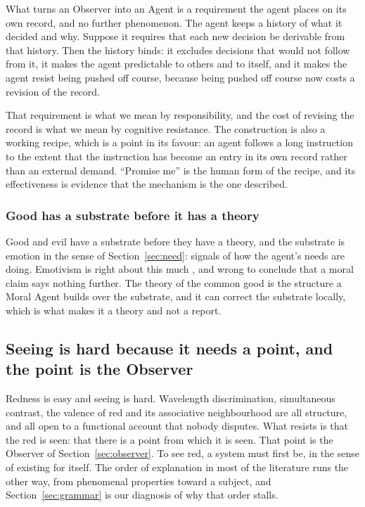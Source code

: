 What turns an Observer into an Agent is a requirement the agent places on its own record, and no
further phenomenon. The agent keeps a history of what it decided and why. Suppose it requires that each
new decision be derivable from that history. Then the history binds: it excludes decisions that would
not follow from it, it makes the agent predictable to others and to itself, and it makes the agent
resist being pushed off course, because being pushed off course now costs a revision of the record.

That requirement is what we mean by responsibility, and the cost of revising the record is what we mean
by cognitive resistance. The construction is also a working recipe, which is a point in its favour: an
agent follows a long instruction to the extent that the instruction has become an entry in its own
record rather than an external demand. ``Promise me'' is the human form of the recipe, and its
effectiveness is evidence that the mechanism is the one described.

\subsubsection{Good has a substrate before it has a theory}

Good and evil have a substrate before they have a theory, and the substrate is emotion in the sense of
Section~\ref{sec:need}: signals of how the agent's needs are doing. Emotivism is right about this much
\citep{ayer1936}, and wrong to conclude that a moral claim says nothing further. The theory of the
common good is the structure a Moral Agent builds over the substrate, and it can correct the substrate
locally, which is what makes it a theory and not a report.

\subsection{Seeing is hard because it needs a point, and the point is the Observer}
\label{sec:seeing}

Redness is easy and seeing is hard. Wavelength discrimination, simultaneous contrast, the valence of red
and its associative neighbourhood are all structure, and all open to a functional account that nobody
disputes. What resists is that the red is seen: that there is a point from which it is seen. That point
is the Observer of Section~\ref{sec:observer}. To see red, a system must first be, in the sense of
existing for itself. The order of explanation in most of the literature runs the other way, from
phenomenal properties toward a subject, and Section~\ref{sec:grammar} is our diagnosis of why that order stalls.

